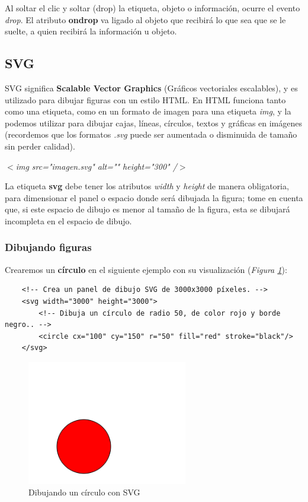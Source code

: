 Al soltar el clic y soltar (drop) la etiqueta, objeto o información, ocurre el evento \textit{drop}. El atributo \textbf{ondrop} va ligado al objeto que recibirá lo que sea que se le suelte, a quien recibirá la información u objeto.


\subsection{SVG}
\hspace{0.55cm} SVG significa \textbf{Scalable Vector Graphics} (Gráficos vectoriales escalables), y es utilizado para dibujar figuras con un estilo HTML. En HTML funciona tanto como una etiqueta, como en un formato de imagen para una etiqueta \textit{img}, y la podemos utilizar para dibujar cajas, líneas, círculos, textos y gráficas en imágenes (recordemos que los formatos \textit{.svg} puede ser aumentada o disminuida de tamaño sin perder calidad).
\begin{center}
    \textit{$<$img src="imagen.svg" alt="" height="300" /$>$}
\end{center}

La etiqueta \textbf{svg} debe tener los atributos \textit{width} y \textit{height} de manera obligatoria, para dimensionar el panel o espacio donde será dibujada la figura; tome en cuenta que, si este espacio de dibujo es menor al tamaño de la figura, esta se dibujará incompleta en el espacio de dibujo.


\subsubsection{Dibujando figuras}
\hspace{0.55cm}Crearemos un \textbf{círculo} en el siguiente ejemplo con su visualización (\textit{Figura \ref{fig: 20}}):
\begin{lstlisting}
    <!-- Crea un panel de dibujo SVG de 3000x3000 píxeles. -->
    <svg width="3000" height="3000">
        <!-- Dibuja un círculo de radio 50, de color rojo y borde negro.. -->
        <circle cx="100" cy="150" r="50" fill="red" stroke="black"/>
    </svg>
\end{lstlisting}
\begin{figure}[H]
    \centering
    \caption{Dibujando un círculo con SVG}
    \label{fig: 20}
    \includegraphics[width=7cm]{ss_html/svg_circle.png}
\end{figure}

